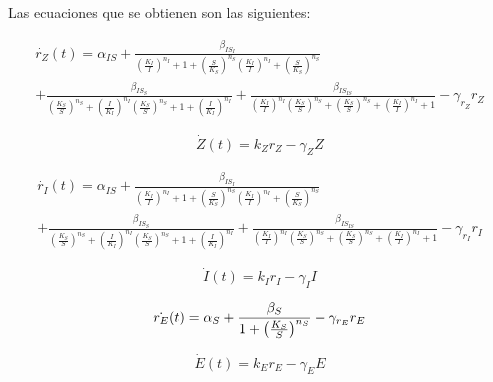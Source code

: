 \documentclass[12pt]{article}
\begin{document}
Las ecuaciones que se obtienen son las siguientes:

\begin{multline}
\label{eq:rZ}
\dot{r_Z}(t) = 
\alpha_{IS}
+ \frac{\beta_{IS_I}}{\left( \frac{K_I}{I} \right)^{n_I} + 1 + \left( \frac{S}{K_S} \right)^{n_S} \left( \frac{K_I}{I} \right)^{n_I} + \left( \frac{S}{K_S} \right)^{n_S}}\\
+ \frac{\beta_{IS_S}}{\left( \frac{K_S}{S} \right)^{n_S} + \left( \frac{I}{K_I} \right)^{n_I} \left( \frac{K_S}{S} \right)^{n_S} + 1 + \left( \frac{I}{K_I} \right)^{n_I}}
+ \frac{\beta_{IS_{IS}}}{\left( \frac{K_I}{I} \right)^{n_I} \left( \frac{K_S}{S} \right)^{n_S} + \left( \frac{K_S}{S} \right)^{n_S} + \left( \frac{K_I}{I} \right)^{n_I} + 1}
- \gamma_{r_Z} r_Z
\end{multline}

\begin{equation}
\label{eq:Z}
\dot{Z}(t) = k_Z r_Z - \gamma_Z Z
\end{equation}

\begin{multline}
\label{eq:rI}
\dot{r_I}(t) = 
\alpha_{IS}
+ \frac{\beta_{IS_I}}{\left( \frac{K_I}{I} \right)^{n_I} + 1 + \left( \frac{S}{K_S} \right)^{n_S} \left( \frac{K_I}{I} \right)^{n_I} + \left( \frac{S}{K_S} \right)^{n_S}}\\
+ \frac{\beta_{IS_S}}{\left( \frac{K_S}{S} \right)^{n_S} + \left( \frac{I}{K_I} \right)^{n_I} \left( \frac{K_S}{S} \right)^{n_S} + 1 + \left( \frac{I}{K_I} \right)^{n_I}}
+ \frac{\beta_{IS_{IS}}}{\left( \frac{K_I}{I} \right)^{n_I} \left( \frac{K_S}{S} \right)^{n_S} + \left( \frac{K_S}{S} \right)^{n_S} + \left( \frac{K_I}{I} \right)^{n_I} + 1}
- \gamma_{r_I} r_I
\end{multline}

\begin{equation}
\label{eq:I}
\dot{I}(t) = k_I r_I - \gamma_I I
\end{equation}

\begin{equation}
\label{eq:r_E}
\dot{r_E}(t) = \alpha_S + \frac{\beta_S}{1+ \left( \frac{K_S}{S}\right)^{n_S}} - \gamma_{r_E} r_E\\
\end{equation}

\begin{equation}
\label{eq:E}
\dot{E}(t) = k_E r_E - \gamma_EE
\end{equation}

\end{document}
